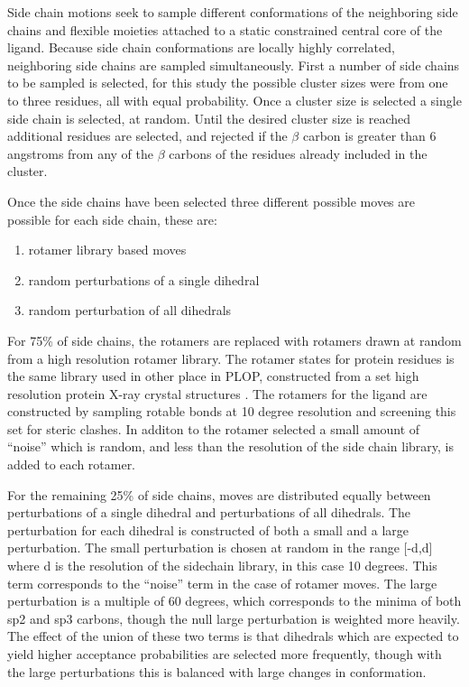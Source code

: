 Side chain motions seek to sample different conformations of the neighboring side chains and flexible moieties attached to a static constrained central core of the ligand.
Because side chain conformations are locally highly correlated, neighboring side chains are sampled simultaneously.
First a number of side chains to be sampled is selected, for this study the possible cluster sizes were from one to three residues, all with equal probability.
Once a cluster size is selected a single side chain is selected, at random.
Until the desired cluster size is reached additional residues are selected, and rejected if the $\beta$ carbon is greater than 6 angstroms from any of the $\beta$ carbons of the residues already included in the cluster.

Once the side chains have been selected three different possible moves are possible for each side chain, these are:
\begin{enumerate}
\item rotamer library based moves
\item random perturbations of a single dihedral
\item random perturbation of all dihedrals
\end{enumerate}

For 75\% of side chains, the rotamers are replaced with rotamers drawn at random from a high resolution rotamer library.
The rotamer states for protein residues is the same library used in other place in PLOP, constructed from a set high resolution protein X-ray crystal structures \cite{xiang2001extending}.
The rotamers for the ligand are constructed by sampling rotable bonds at 10 degree resolution and screening this set for steric clashes.
In additon to the rotamer selected a small amount of ``noise'' which is random, and less than the resolution of the side chain library, is added to each rotamer.

For the remaining 25\% of side chains, moves are distributed equally between perturbations of a single dihedral and perturbations of all dihedrals.
The perturbation for each dihedral is constructed of both a small and a large perturbation.
The small perturbation is chosen at random in the range [-d,d] where d is the resolution of the sidechain library, in this case 10 degrees.
This term corresponds to the ``noise'' term in the case of rotamer moves.
The large perturbation is a multiple of 60 degrees, which corresponds to the minima of both sp2 and sp3 carbons, though the null large perturbation is weighted more heavily.
The effect of the union of these two terms is that dihedrals which are expected to yield higher acceptance probabilities are selected more frequently, though with the large perturbations this is balanced with large changes in conformation.

